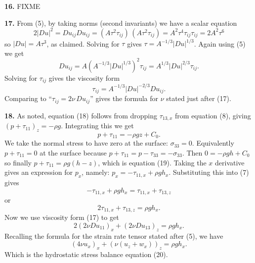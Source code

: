 \documentclass[10pt]{amsart}
\newcommand{\prob}[1]{\bigskip\noindent\large\textbf{#1.}\normalsize }
\begin{document}
\prob{16}  FIXME

\prob{17}  From (5), by taking norms (second invariants) we have a scalar equation
    $$2 |Du|^2 = Du_{ij} Du_{ij} = (A \tau^2 \tau_{ij})\,(A \tau^2 \tau_{ij}) = A^2 \tau^4 \tau_{ij} \tau_{ij} = 2 A^2 \tau^6$$
so $|Du|=A\tau^3$, as claimed.  Solving for $\tau$ gives $\tau = A^{-1/3} |Du|^{1/3}$.  Again using (5) we get
    $$Du_{ij} = A \left(A^{-1/3} |Du|^{1/3}\right)^2 \tau_{ij} = A^{1/3} |Du|^{2/3} \tau_{ij}.$$
Solving for $\tau_{ij}$ gives the viscosity form
    $$\tau_{ij} = A^{-1/3} |Du|^{-2/3} Du_{ij}.$$
Comparing to ``$\tau_{ij} = 2 \nu\, Du_{ij}$'' gives the formula for $\nu$ stated just after (17).

\prob{18}  As noted, equation (18) follows from dropping $\tau_{13,x}$ from equation (8), giving $(p+\tau_{11})_z = -\rho g$.  Integrating this we get
    $$p+\tau_{11} = -\rho g z + C_0.$$
We take the normal stress to have zero at the surface: $\sigma_{33} = 0$.  Equivalently $p+\tau_{11}=0$ at the surface because $p+\tau_{11} = p-\tau_{33} = -\sigma_{33}$.  Then $0=-\rho g h + C_0$ so finally $p + \tau_{11} = \rho g (h-z)$, which is equation (19).  Taking the $x$ derivative gives an expression for $p_x$, namely: $p_x = -\tau_{11,x} + \rho g h_x$.  Substituting this into (7) gives
    $$-\tau_{11,x} + \rho g h_x = \tau_{11,x} + \tau_{13,z}$$
or
    $$2 \tau_{11,x} + \tau_{13,z} = \rho g h_x.$$
Now we use viscosity form (17) to get
    $$2 \left(2 \nu Du_{11}\right)_x + \left(2 \nu Du_{13}\right)_z = \rho g h_x.$$
Recalling the formula for the strain rate tensor stated after (5), we have
    $$\left(4 \nu u_x\right)_x + \left(\nu (u_z + w_x)\right)_z = \rho g h_x.$$
Which is the hydrostatic stress balance equation (20).
\end{document}
